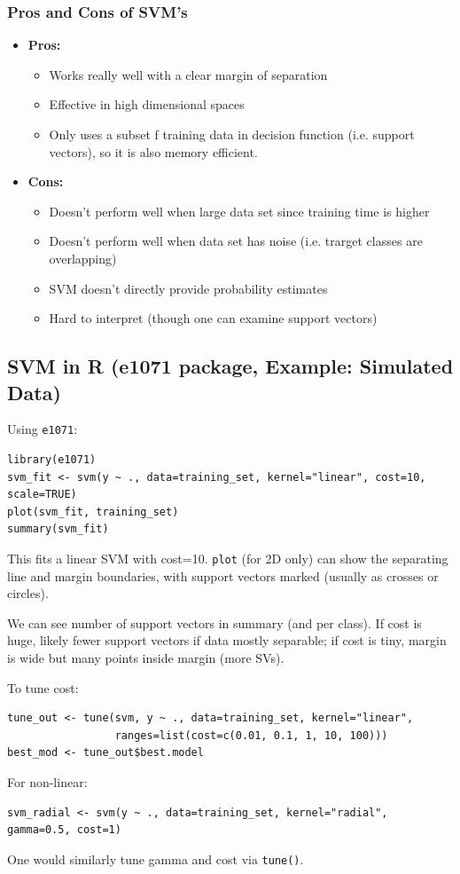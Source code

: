 \documentclass[11pt]{article}
\begin{document}
\subsubsection{Pros and Cons of SVM's}
\begin{itemize}
    \item \textbf{Pros:}
        \begin{itemize}
            \item Works really well with a clear margin of separation
            \item Effective in high dimensional spaces
            \item Only uses a subset f training data in decision function (i.e. support vectors), so it is also memory efficient.
        \end{itemize}
    \item \textbf{Cons:}
        \begin{itemize}
            \item Doesn't perform well when large data set since training time is higher
            \item Doesn't perform well when data set has noise (i.e. trarget classes are overlapping)
            \item SVM doesn't directly provide probability estimates
            \item Hard to interpret (though one can examine support vectors)
        \end{itemize}
\end{itemize}

\subsection{SVM in R (e1071 package, Example: Simulated Data)}
Using \texttt{e1071}:
\begin{verbatim}
library(e1071)
svm_fit <- svm(y ~ ., data=training_set, kernel="linear", cost=10, scale=TRUE)
plot(svm_fit, training_set)
summary(svm_fit)
\end{verbatim}
This fits a linear SVM with cost=10. \texttt{plot} (for 2D only) can show the separating line and margin boundaries, with support vectors marked (usually as crosses or circles). 

We can see number of support vectors in summary (and per class). If cost is huge, likely fewer support vectors if data mostly separable; if cost is tiny, margin is wide but many points inside margin (more SVs).

To tune cost:
\begin{verbatim}
tune_out <- tune(svm, y ~ ., data=training_set, kernel="linear",
                 ranges=list(cost=c(0.01, 0.1, 1, 10, 100)))
best_mod <- tune_out$best.model
\end{verbatim}
For non-linear:
\begin{verbatim}
svm_radial <- svm(y ~ ., data=training_set, kernel="radial", gamma=0.5, cost=1)
\end{verbatim}
One would similarly tune gamma and cost via \texttt{tune()}.
\end{document}
